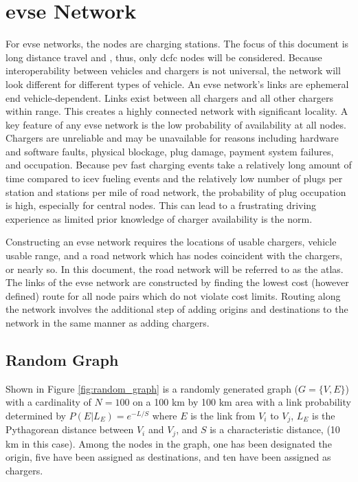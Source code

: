 \section{\gls{evse} Network}

For \gls{evse} networks, the nodes are charging stations. The focus of this document is long distance travel and , thus, only \gls{dcfc} nodes will be considered. Because interoperability between vehicles and chargers is not universal, the network will look different for different types of vehicle. An \gls{evse} network's links are ephemeral end vehicle-dependent. Links exist between all chargers and all other chargers within range. This creates a highly connected network with significant locality. A key feature of any \gls{evse} network is the low probability of availability at all nodes. Chargers are unreliable and may be unavailable for reasons including hardware and software faults, physical blockage, plug damage, payment system failures, and occupation. Because \gls{pev} fast charging events take a relatively long amount of time compared to \gls{icev} fueling events and the relatively low number of plugs per station and stations per mile of road network, the probability of plug occupation is high, especially for central nodes. This can lead to a frustrating driving experience as limited prior knowledge of charger availability is the norm.

Constructing an \gls{evse} network requires the locations of usable chargers, vehicle usable range, and a road network which has nodes coincident with the chargers, or nearly so. In this document, the road network will be referred to as the atlas. The links of the \gls{evse} network are constructed by finding the lowest cost (however defined) route for all node pairs which do not violate cost limits. Routing along the network involves the additional step of adding origins and destinations to the network in the same manner as adding chargers.

\subsection*{Random Graph}

Shown in Figure \ref{fig:random_graph} is a randomly generated graph ($G = \{V, E\}$) with a cardinality of $N = 100$ on a 100 km by 100 km area with a link probability determined by $P(E|L_E) = e^{-L / S}$ where $E$ is the link from $V_i$ to $V_j$, $L_E$ is the Pythagorean distance between $V_i$ and $V_j$, and $S$ is a characteristic distance, (10 km in this case). Among the nodes in the graph, one has been designated the origin, five have been assigned as destinations, and ten have been assigned as chargers.

